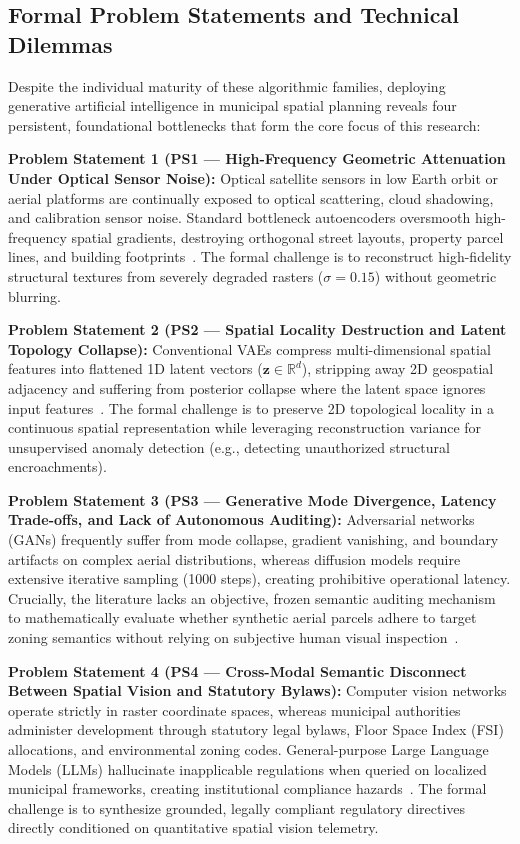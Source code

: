 \documentclass[journal]{IEEEtran}
\begin{document}
\subsection{Formal Problem Statements and Technical Dilemmas}
Despite the individual maturity of these algorithmic families, deploying generative artificial intelligence in municipal spatial planning reveals four persistent, foundational bottlenecks that form the core focus of this research:

\noindent\textbf{Problem Statement 1 (PS1 --- High-Frequency Geometric Attenuation Under Optical Sensor Noise):} Optical satellite sensors in low Earth orbit or aerial platforms are continually exposed to optical scattering, cloud shadowing, and calibration sensor noise. Standard bottleneck autoencoders oversmooth high-frequency spatial gradients, destroying orthogonal street layouts, property parcel lines, and building footprints~\cite{zhang2017beyond,ronneberger2015u}. The formal challenge is to reconstruct high-fidelity structural textures from severely degraded rasters ($\sigma = 0.15$) without geometric blurring.

\noindent\textbf{Problem Statement 2 (PS2 --- Spatial Locality Destruction and Latent Topology Collapse):} Conventional VAEs compress multi-dimensional spatial features into flattened 1D latent vectors ($\mathbf{z} \in \mathbb{R}^d$), stripping away 2D geospatial adjacency and suffering from posterior collapse where the latent space ignores input features~\cite{kingma2013auto,higgins2017beta}. The formal challenge is to preserve 2D topological locality in a continuous spatial representation while leveraging reconstruction variance for unsupervised anomaly detection (e.g., detecting unauthorized structural encroachments).

\noindent\textbf{Problem Statement 3 (PS3 --- Generative Mode Divergence, Latency Trade-offs, and Lack of Autonomous Auditing):} Adversarial networks (GANs) frequently suffer from mode collapse, gradient vanishing, and boundary artifacts on complex aerial distributions, whereas diffusion models require extensive iterative sampling (1000 steps), creating prohibitive operational latency. Crucially, the literature lacks an objective, frozen semantic auditing mechanism to mathematically evaluate whether synthetic aerial parcels adhere to target zoning semantics without relying on subjective human visual inspection~\cite{miyato2018spectral,miyato2018cgans,dhariwal2021diffusion,song2020denoising}.

\noindent\textbf{Problem Statement 4 (PS4 --- Cross-Modal Semantic Disconnect Between Spatial Vision and Statutory Bylaws):} Computer vision networks operate strictly in raster coordinate spaces, whereas municipal authorities administer development through statutory legal bylaws, Floor Space Index (FSI) allocations, and environmental zoning codes. General-purpose Large Language Models (LLMs) hallucinate inapplicable regulations when queried on localized municipal frameworks, creating institutional compliance hazards~\cite{schwartz2020green}. The formal challenge is to synthesize grounded, legally compliant regulatory directives directly conditioned on quantitative spatial vision telemetry.
\end{document}
